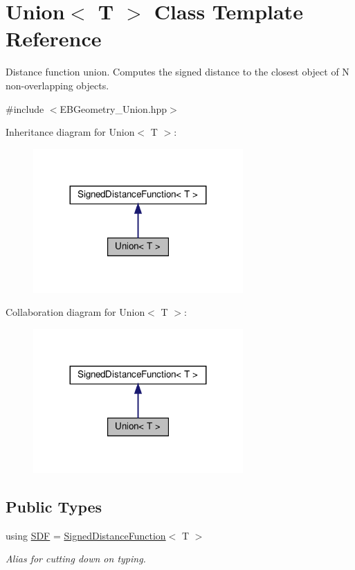 \hypertarget{classUnion}{}\section{Union$<$ T $>$ Class Template Reference}
\label{classUnion}


Distance function union. Computes the signed distance to the closest object of N non-\/overlapping objects.  




{\ttfamily \#include $<$E\+B\+Geometry\+\_\+\+Union.\+hpp$>$}



Inheritance diagram for Union$<$ T $>$\+:\nopagebreak
\begin{figure}[H]
\begin{center}
\leavevmode
\includegraphics[width=227pt]{classUnion__inherit__graph}
\end{center}
\end{figure}


Collaboration diagram for Union$<$ T $>$\+:\nopagebreak
\begin{figure}[H]
\begin{center}
\leavevmode
\includegraphics[width=227pt]{classUnion__coll__graph}
\end{center}
\end{figure}
\subsection*{Public Types}
\begin{DoxyCompactItemize}
\item 
\mbox{\label{classUnion_a9e9d1d95ae54fa471c6f29e778239021}} 
using \hyperlink{classUnion_a9e9d1d95ae54fa471c6f29e778239021}{S\+DF} = \hyperlink{classSignedDistanceFunction}{Signed\+Distance\+Function}$<$ T $>$
\begin{DoxyCompactList}\small\item\em Alias for cutting down on typing. \end{DoxyCompactList}\end{DoxyCompactItemize}
